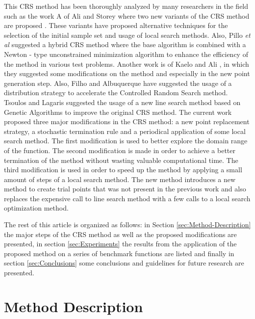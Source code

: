 \documentclass[symmetry,article,submit,moreauthors,pdftex]{mdpi}
\begin{document}
This CRS method has been thoroughly analyzed by many researchers in
the field such as the work A of Ali and Storey where two new variants
of the CRS method are proposed \cite{crs_modif0}. These variants
have proposed alternative techniques for the selection of the initial
sample set and usage of local search methods. Also, Pillo \emph{et
al} \cite{crs_modif1} suggested a hybrid CRS method where the base
algorithm is combined with a Newton - type unconstrained minimization
algorithm \cite{crs_newton} to enhance the efficiency of the method
in various test problems. Another work is of Kaelo and Ali , in which
they suggested \cite{crs_modif2} some modifications on the method
and especially in the new point generation step. Also, Filho and Albuquerque
have suggested \cite{crs_modif3} the usage of a distribution strategy
to accelerate the Controlled Random Search method. Tsoulos and Lagaris \cite{TsoulosCRS} suggested the usage of a new line search method based on Genetic Algorithms to improve the original CRS method.  The current work
proposed three major modifications in the CRS method: a new point
replacement strategy, a stochastic termination rule and a periodical
application of some local search method. The first modification is
used to better explore the domain range of the function. The second
modification is made in order to achieve a better termination of the
method without wasting valuable computational time. The third modification
is used in order to speed up the method by applying a small amount
of steps of a local search method. The new method introduces a new method to create trial points that was not  present in the previous work \cite{TsoulosCRS} and also replaces the expensive call to line search method with a few calls to a local search optimization method.

The rest of this article is organized as follows:\textbf{ }in Section
\ref{sec:Method-Description} the major steps of the CRS method as
well as the proposed modifications are presented, in section \ref{sec:Experiments}
the results from the application of the proposed method on a series
of benchmark functions are listed and finally in section \ref{sec:Conclusions} 
some conclusions and guidelines for future research are  presented.

\section{Method Description \label{sec:Method-Description}}
\end{document}
